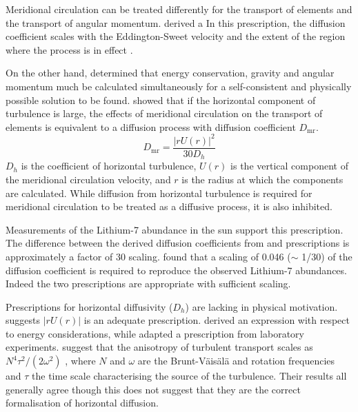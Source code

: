 Meridional circulation can be treated differently for the transport of elements and the transport of angular momentum.
\citet{endal_evolution_1978} derived a
In this prescription, the diffusion coefficient scales with the Eddington-Sweet velocity and the extent of the region where the process is in effect \citep[See][]{kippenhahn_circulation_1974, endal_evolution_1978,heger_presupernova_2000}.

On the other hand, \citet{zahn_circulation_1992} determined that energy conservation, gravity and angular momentum much be calculated simultaneously for a self-consistent and physically possible solution to be found.
\citet{chaboyer_effect_1992} showed that if the horizontal component of turbulence is large, the effects of meridional circulation on the transport of elements is equivalent to a diffusion process with diffusion coefficient $D_{\text{mr}}$.
\begin{equation}
    D_{\text{mr}} = \frac{\left| r U(r)\right|^2}{30 D_h}
    \label{eq:mr_d}
\end{equation}
$D_h$ is the coefficient of horizontal turbulence, $U(r)$ is the vertical component of the meridional circulation velocity, and $r$ is the radius at which the components are calculated.
While diffusion from horizontal turbulence is required for meridional circulation to be treated as a diffusive process, it is also inhibited.

Measurements of the Lithium-7 abundance in the sun support this prescription.
The difference between the derived diffusion coefficients from \citet{kippenhahn_circulation_1974,endal_evolution_1978, heger_presupernova_2000} and \citet{chaboyer_effect_1992} prescriptions is approximately a factor of 30 scaling.
\citet{pinsonneault_evolutionary_1989} found that a scaling of 0.046 ($\sim$ 1/30) of the \citet{kippenhahn_circulation_1974} diffusion coefficient is required to reproduce the observed Lithium-7 abundances.
Indeed the two prescriptions are appropriate with sufficient scaling.

Prescriptions for horizontal diffusivity ($D_h$) are lacking in physical motivation.
\citet{zahn_circulation_1992} suggests  $\left|rU(r)\right|$ is an adequate prescription.
\citet{maeder_stellar_2003} derived an expression with respect to energy considerations, while \citet{mathis_transport_2004} adapted a prescription from laboratory experiments.
\citet{mathis_anisotropic_2018} suggest that the anisotropy of turbulent transport scales as  $N^4\tau^2/(2\omega^2)$ , where $N$ and $\omega$ are the Brunt-V\"{a}is\"{a}l\"{a} and rotation frequencies and $\tau$ the time scale characterising the source of the turbulence.  
Their results all generally agree though this does not suggest that they are the correct formalisation of horizontal diffusion.

